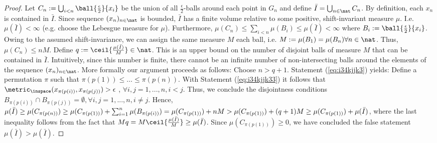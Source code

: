 \begin{lem}
\begin{proof}
Let $C_n := \bigcup_{i < n} \ball{\frac \epsilon 2}{x_i} $ be the union of all $\frac \epsilon 2$-balls around each point in $G_n$ and define $\bar I = \bigcup_{n \in \nat} C_n$.
By definition, each $x_n$ is contained in $\bar I$.
Since sequence $(x_n)_{n \in \nat}$ is bounded, $\bar I $ has a finite volume relative to some positive, shift-invariant measure $\mu$. I.e. $\mu(\bar I) < \infty$ (e.g. choose the Lebesgue measure for $\mu$). Furthermore, $\mu(C_n) \leq \sum_{i <n} \mu(B_i) \leq \mu(\bar I)< \infty$ where $B_i := \ball{\frac \epsilon 2}{x_i}$. Owing to the assumed shift-invariance, we can assign the same measure $M$ each ball, i.e. $M:=\mu(B_1) = \mu(B_n)\forall n \in \nat$. Thus, $\mu(C_n) \leq n M$.
Define $q:= \ceil{\frac{\mu(\bar I)}{M}} \in \nat$. This is an upper bound on the number of disjoint balls of measure $M$  that can be contained in $\bar I$. Intuitively, since this number is finite, there cannot be an infinite number of non-intersecting balls around the elements of the sequence $(x_n)_{n \in \nat}$. More formally our argument proceeds as follows:
Choose $n > q+1$. Statement (\ref{eq:i34kjjk3}) yields:
  Define a permutation $\pi$ such that $\pi(p(1)) \leq \ldots \leq \pi(p(n))$. 
With Statement (\ref{eq:i34kjjk33}) it follows that \\
${\metric_\inspace(x_{\pi(p(i))},x_{\pi(p(j))}) > \epsilon}$ , $\forall i,j =1,...,n, i < j$. Thus, we conclude the disjointness conditions $B_{\pi(p(i))} \cap B_{\pi(p(j))} = \emptyset , \forall i,j =1,...,n, i \neq j$. 
Hence,  $\mu(\bar I) \geq \mu(C_{\pi(p(n))}) \geq \mu(C_{\pi(p(1))}) + \sum_{i=1}^n \mu(B_{\pi(p(i))}) \newline = \mu(C_{\pi(p(1))}) +  n M > \mu(C_{\pi(p(1))}) + (q+1) M \geq\mu(C_{\pi(p(1))}) + \mu(\bar I)$, where the last inequality follows from the fact that  $M q= M \ceil{\frac{\mu(\bar I)}{M}} \geq \mu(\bar I)$. Since $\mu(C_{\pi(p(1))}) \geq 0$, we have concluded the false statement $\mu(\bar I) > \mu(\bar I)$.

\end{proof}
\label{lem:bndseq_entails_distgridvanish}
\end{lem} 


